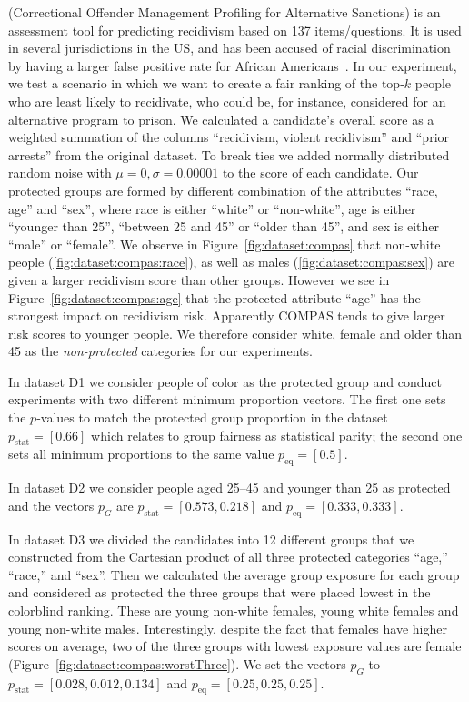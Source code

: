  (Correctional Offender Management Profiling for Alternative Sanctions) is an assessment tool for predicting recidivism based on 137 items/questions. It is used in several jurisdictions in the US, and has been accused of racial discrimination by having a larger false positive rate for African Americans~\cite{angwin_2016_machine}.
%
In our experiment, we test a scenario in which we want to create a fair ranking of the top-$k$ people who are least likely to recidivate, who could be, for instance, considered for an alternative program to prison.
%
We calculated a candidate's overall score as a weighted summation of the columns ``recidivism, violent recidivism'' and ``prior arrests'' from the original dataset.
%
To break ties we added normally distributed random noise with $\mu=0, \sigma=0.00001$ to the score of each candidate.
%
Our protected groups are formed by different combination of the attributes ``race, age'' and ``sex'', where race is either ``white'' or ``non-white'', age is either ``younger than 25'', ``between 25 and 45'' or ``older than 45'', and sex is either ``male'' or ``female''.
%
We observe in Figure~\ref{fig:dataset:compas} that non-white people (\ref{fig:dataset:compas:race}), as well as males (\ref{fig:dataset:compas:sex}) are given a larger recidivism score than other groups.
%
However we see in Figure~\ref{fig:dataset:compas:age} that the protected attribute ``age'' has the strongest impact on recidivism risk.
%
Apparently COMPAS tends to give larger risk scores to younger people.
%
We therefore consider white, female and older than 45 as the \emph{non-protected} categories for our experiments.


In dataset D1 we consider people of color as the protected group and conduct experiments with two different minimum proportion vectors.
%
The first one sets the $p$-values to match the protected group proportion in the dataset $p_{\text{stat}}=[0.66]$ which relates to group fairness as statistical parity; the second one sets all minimum proportions to the same value $p_{\text{eq}}=[0.5]$.


In dataset D2 we consider people aged 25--45 and younger than 25 as protected and the vectors $p_G$ are $p_{\text{stat}}=[0.573,0.218]$ and $p_{\text{eq}}=[0.333, 0.333]$.


In dataset D3 we divided the candidates into 12 different groups that we constructed from the Cartesian product of all three protected categories ``age,'' ``race,'' and ``sex''.
%
Then we calculated the average group exposure for each group and considered as protected the three groups that were placed lowest in the colorblind ranking.
%
These are young non-white females, young white females and young non-white males.
%
Interestingly, despite the fact that females have higher scores on average, two of the three groups with lowest exposure values are female (Figure~\ref{fig:dataset:compas:worstThree}).
%
We set the vectors $p_G$ to $p_{\text{stat}}=[0.028,0.012,0.134]$ and $p_{\text{eq}}=[0.25,0.25,0.25]$.


